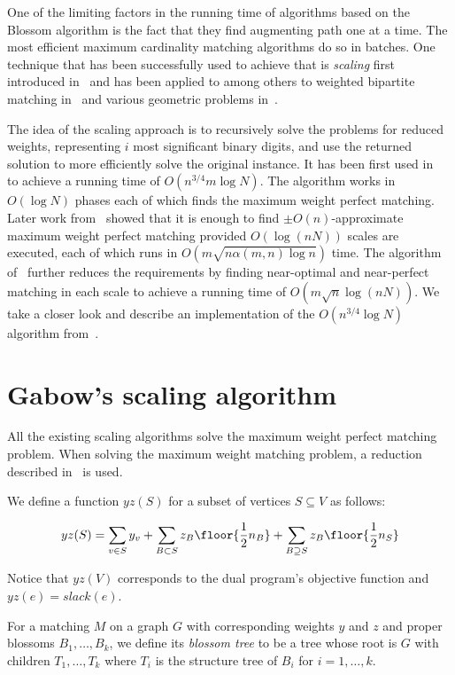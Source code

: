 
One of the limiting factors in the running time of algorithms based on the Blossom algorithm is the fact that they find augmenting path one at a time. The most efficient maximum cardinality matching algorithms do so in batches. One technique that has been successfully used to achieve that is \textit{scaling} first introduced in~\cite{edmonds1972theoretical} and has been applied to among others to weighted bipartite matching in~\cite{gabow1989faster} and various geometric problems in~\cite{gabow1984scaling}. 

The idea of the scaling approach is to recursively solve the problems for reduced weights, representing $i$ most significant binary digits, and use the returned solution to more efficiently solve the original instance. It has been first used in~\cite{gabow1985scaling} to achieve a running time of $O(n^{3/4}m \log N)$. The algorithm works in $O(\log N)$ phases each of which finds the maximum weight perfect matching. Later work from~\cite{gabow1991faster} showed that it is enough to find $\pm O(n)$-approximate maximum weight perfect matching provided $O(\log(nN))$ scales are executed, each of which runs in $O(m\sqrt{n \alpha(m,n)\log n})$ time. The algorithm of~\cite{duan2018scaling} further reduces the requirements by finding near-optimal and near-perfect matching in each scale to achieve a running time of $O(m \sqrt{n} \log(nN))$. We take a closer look and describe an implementation of the $O(n^{3/4}\log N)$ algorithm from~\cite{gabow1985scaling}.

\section{Gabow's scaling algorithm}

All the existing scaling algorithms solve the maximum weight perfect matching problem. When solving the maximum weight matching problem, a reduction described in~ is used.

We define a function $yz(S)$ for a subset of vertices $S \subseteq V$ as follows:

\[
yz(S) = \sum_{v \in S} y_v + \sum_{B \subset S} z_B \floor{\frac{1}{2}n_B} + \sum_{B \supseteq S} z_B \floor{\frac{1}{2}n_S}
\]

Notice that $yz(V)$ corresponds to the dual program's objective function and $yz(e) = slack(e)$.

\begin{defn}
    For a matching $M$ on a graph $G$ with corresponding weights $y$ and $z$ and proper blossoms $B_1, \dots, B_k$, we define its \emph{blossom tree} to be a tree whose root is $G$ with children $T_1, \dots, T_k$ where $T_i$ is the structure tree of $B_i$ for $i = 1, \dots, k$.
\end{defn}

